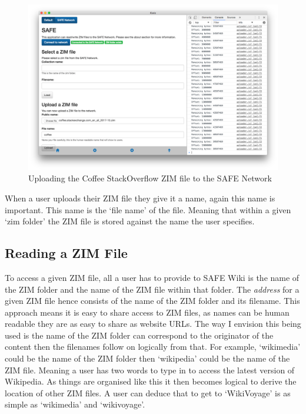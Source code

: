 \begin{figure}[h]
	\begin{center}
		\includegraphics[width=\textwidth]{images/safe-wiki-uploading-coffee}
		\caption{Uploading the Coffee StackOverflow ZIM file to the SAFE Network}
		\label{fig:safe-upload-coffee}
	\end{center}
\end{figure}

When a user uploads their ZIM file they give it a name, again this name is important. This name is the `file name' of the file. Meaning that within a given `zim folder' the ZIM file is stored against the name the user specifies.

\subsection{Reading a ZIM File}

To access a given ZIM file, all a user has to provide to SAFE Wiki is the name of the ZIM folder and the name of the ZIM file within that folder. The \textit{address} for a given ZIM file hence consists of the name of the ZIM folder and its filename. This approach means it is easy to share access to ZIM files, as names can be human readable they are as easy to share as website URLs. The way I envision this being used is the name of the ZIM folder can correspond to the originator of the content then the filenames follow on logically from that. For example, `wikimedia' could be the name of the ZIM folder then `wikipedia' could be the name of the ZIM file. Meaning a user has two words to type in to access the latest version of Wikipedia. As things are organised like this it then becomes logical to derive the location of other ZIM files. A user can deduce that to get to `WikiVoyage' is as simple as `wikimedia' and `wikivoyage'.

